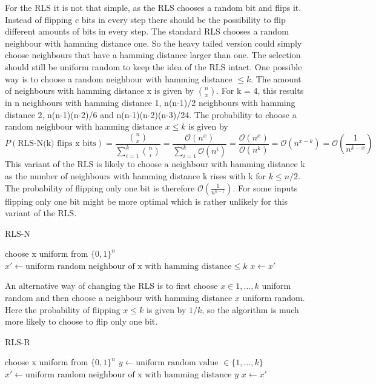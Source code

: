 For the RLS it is not that simple, as the RLS chooses a random bit and flips it. Instead of flipping c bits in every step
there should be the possibility to flip different amounts of bits in every step. The standard RLS chooses a random neighbour
with hamming distance one. So the heavy tailed version could simply choose neighbours that have a hamming distance larger than one.
The selection should still be uniform random to keep the idea of the RLS intact. One possible way is to choose a random
neighbour with hamming distance $\le k$. The amount of neighbours with hamming distance x is given by $\binom{n}{x}$. For
k = 4, this results in n neighbours with hamming distance 1, n(n-1)/2 neighbours with hamming distance 2, n(n-1)(n-2)/6
and n(n-1)(n-2)(n-3)/24. The probability to choose a random neighbour with hamming distance $x \le k$ is given by
\[P(\text{RLS-N(k) flips x bits}) = \frac{\binom{n}{x}}{\sum_{i=1}^k \binom{n}{i}} = \frac{\mathcal{O}(n^x)}{\sum_{i=1}^k \mathcal{O}(n^i)}
      = \frac{\mathcal{O}(n^x)}{\mathcal{O}(n^k)} = \mathcal{O}(n^{x-k}) = \mathcal{O}(\frac{1}{n^{k-x}})\]
This variant of the RLS is likely to choose a neighbour with hamming distance k as the number of neighbours with hamming
distance k rises with k for $k \le n/2$. The probability of flipping only one bit is therefore $\mathcal{O}(\frac{1}{n^{k-1}})$. For some inputs flipping only one bit might be more optimal which is rather unlikely for this variant of the RLS.\newline
\begin{algorithm}[bt]
      \caption{\textsc{RLS-N}}\label{alg:rlsN}

      \DontPrintSemicolon %

      \BlankLine
      choose x uniform from ${\{0,1\}}^n$\;
      {
      $x' \leftarrow \text{uniform random neighbour of x with hamming distance} \le k$\;
      {
      {
            $x \leftarrow x'$\;
      }
      }
      }
\end{algorithm}

An alternative way of changing the RLS is to first choose $x \in {1, \dots, k}$ uniform random and then choose a neighbour with hamming distance $x$ uniform random. Here the probability of flipping $x \le k$ is given by $1/k$, so the algorithm is much more likely to choose to flip only one bit.

\begin{algorithm}[bt]
      \caption{\textsc{RLS-R}}\label{alg:rlsR}

      \DontPrintSemicolon %

      \BlankLine
      choose x uniform from ${\{0,1\}}^n$\;
      {
      $y \leftarrow \text{uniform random value }\in \{1,\dots,k\}$\;
      $x' \leftarrow \text{uniform random neighbour of x with hamming distance } y$\;
      {
      {
            $x \leftarrow x'$\;
      }
      }
      }
\end{algorithm}

